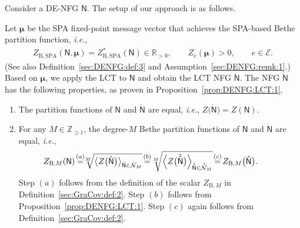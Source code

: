 \documentclass[journal]{IEEEtran}
\newcommand{\vect}[1]{ \bm{#1} }
\newcommand{\set}[1]{\mathcal{#1}}
\newcommand{\setEfull}{ \mathcal{E} }
\newcommand{\sR}{\mathbb{R}}
\newcommand{\vmu}{ \vect{ \mu } }
\newcommand{\graphN}{ \mathsf{N} }
\newcommand{\sZpp}{ \mathbb{Z}_{\geq 1} }
\newcommand{\ZBSPA}{ Z_{\mathrm{B,SPA}} }
\newcommand{\ZBM}{ Z_{\mathrm{B},M} }
\newcommand{\hgraphN}{ \hat{\graphN} }
\newcommand{\LCT}[1]{ \mathring{#1} }
\newcommand{\hLCT}[1]{ \hat{ \LCT{#1} } }
\newcommand{\hLCTgraphN}{ \hLCT{\graphN} }
\newcommand*{\ie}{\textit{i.e.}}
\begin{document}
Consider a DE-NFG $\graphN$. The setup of our approach is as follows.

Let $\vmu$ be the SPA fixed-point message vector that achieves the SPA-based Bethe partition function, \ie,
\begin{align}
  \ZBSPA(\graphN,\vmu) = \ZBSPA^{*}(\graphN) \in \sR_{>0}, \qquad
  Z_{e}(\vmu) >0, \qquad e \in \setEfull. \label{eqn:positive_ZBSPA}
\end{align}
(See also Definition~\ref{sec:DENFG:def:3} and Assumption~\ref{sec:DENFG:remk:1}.)
Based on $\vmu$, we apply the LCT to $\graphN$ and obtain the LCT NFG $ \LCT{\graphN} $.
The NFG $ \LCT{\graphN} $ has the following properties, as proven in Proposition~\ref{prop:DENFG:LCT:1}.
\begin{enumerate}

  \item The partition functions of $ \graphN $ and
        $ \LCT{\graphN} $ are equal, \ie, $ Z\bigl( \LCT{\graphN} \bigr) = Z(\graphN) $.

  \item For any $ M \in \sZpp $, the degree-$M$ Bethe partition functions of $ \graphN $ and
        $ \LCT{\graphN} $ are equal, \ie,
        \begin{align*}
          \!\!\!\!\!\!\!\!\ZBM(\graphN)
           & \! \overset{(a)}{=}\! \!\! \sqrt[M]{
                                          \bigl\langle
                                          Z\bigl( \hgraphN \bigr)
                                          \bigr\rangle_{ \hgraphN \in \hat{\set{N}}_{M}}
                                        }
          \!\overset{(b)}{=} \!\! \sqrt[M]{
                                    \Bigl\langle
                                    Z\bigl( \hLCTgraphN \bigr)
                                    \Bigr\rangle_{ \hLCTgraphN \in \hLCT{\set{N}}_{M} }
                                  }
          \! \overset{(c)}{=} \! \ZBM\bigl( \LCT{\graphN} \bigr).
        \end{align*}
        Step $(a)$ follows from the definition of the scalar $ \ZBM $ in
        Definition~\ref{sec:GraCov:def:2}.  Step $(b)$ follows from
        Proposition~\ref{prop:DENFG:LCT:1}. Step $(c)$ again follows from
        Definition~\ref{sec:GraCov:def:2}.


\end{enumerate}
\end{document}
